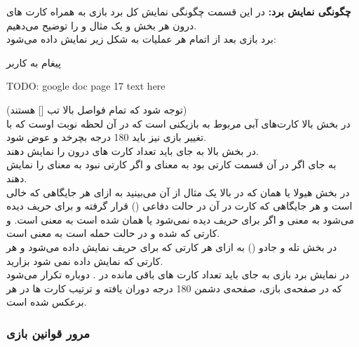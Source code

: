 \documentclass[]{article}
\begin{document}
\vspace{.5cm}
\textbf{چگونگی نمایش برد:}
در این قسمت چگونگی نمایش کل برد بازی به همراه کارت های درون هر بخش و یک 
مثال و را توضیح می‌دهیم.
\\
برد بازی بعد از اتمام هر عملیات به شکل زیر نمایش داده می‌شود:
\begin{mybox}[colback=yellow]{پیغام به کاربر}
	\begin{latin}	
		TODO: google doc page 17 text here
	\end{latin}
\end{mybox}
(توجه شود که تمام فواصل بالا تب [] هستند)  
\\
در بخش بالا کارت‌های آبی مربوط به بازیکنی است که در آن لحظه نوبت اوست که با 
تغییر  بازی نیز باید 180 درجه بچرخد و عوض شود.
\\
در بخش بالا به جای  باید تعداد کارت های درون  را نمایش 
دهند.
\\
به جای  اگر در آن قسمت کارتی بود  به معنای  و اگر 
کارتی نبود  به معنای  را نمایش دهند.
\\
در بخش هیولا یا همان  که در بالا یک مثال از آن می‌بینید به 
ازای هر جایگاهی که خالی است  و هر جایگاهی که کارت در آن در حالت دفاعی 
() قرار گرفته و برای حریف دیده می‌شود  به معنی
  و اگر برای حریف دیده نمی‌شود یا همان  شده است 
 به معنی  است. و کارتی که  شده و در حالت حمله 
 است  به 
 معنی  است.
\\
در بخش تله و جادو () به ازای هر کارتی که برای حریف نمایش 
داده می‌شود  و هر کارتی که نمایش داده نمی شود  بزارید.
\\
در نمایش برد بازی به جای  باید تعداد کارت های باقی مانده در 
. دوباره تکرار می‌شود که در صفحه‌ی بازی‌، صفحه‌ی دشمن 180 درجه دوران 
یافته و ترتیب کارت ها در هر  برعکس شده است.

\subsubsection*{{\titr مرور قوانین بازی}}
\end{document}
